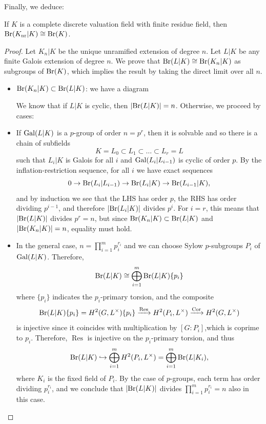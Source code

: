 \documentclass{article}
\begin{document}
Finally, we deduce:
\begin{prop}
		If $K$ is a complete discrete valuation field with finite residue field, then $\text{Br}(K_\text{nr}|K)\cong \text{Br}(K)$.
\end{prop}
\begin{proof}
		Let $K_n|K$ be the unique unramified extension of degree $n$. Let $L|K$ be any finite Galois extension of degree $n$. We prove that $\text{Br}(L|K)\cong\text{Br}(K_n|K)$ as subgroups of $\text{Br}(K)$, which implies the result by taking the direct limit over all $n$.

		\begin{itemize}
				\item $\text{Br}(K_n|K)\subset \text{Br}(L|K)$: we have a diagram

				We know that if $L|K$ is cyclic, then $|\text{Br}(L|K)|=n$. Otherwise, we proceed by cases:
				
				\item If $\operatorname{Gal}(L|K)$ is a $p$-group of order $n=p^r$, then it is solvable and so there is a chain of subfields
				\[
					K = L_0 \subset L_1 \subset \ldots \subset L_r = L	
				\]
				such that $L_i|K$ is Galois for all $i$ and $\operatorname{Gal}(L_i|L_{i-1})$ is cyclic of order $p$. By the inflation-restriction sequence, for all $i$ we have exact sequences
				\[
					0 \to \text{Br}(L_i|L_{i-1}) \to \text{Br}(L_i|K) \to \text{Br}(L_{i-1}|K),
				\]
				and by induction we see that the LHS has order $p$, the RHS has order dividing $p^{i-1}$, and therefore $|\text{Br}(L_i|K)|$ divides $p^i$. For $i=r$, this means that $|\text{Br}(L|K)|$ divides $p^r=n$, but since $\text{Br}(K_n|K)\subset \text{Br}(L|K)$ and $|\text{Br}(K_n|K)|=n$, equality must hold.

				\item In the general case, $n=\prod_{i=1}^m p_i^{r_i}$ and we can choose Sylow $p$-subgroups $P_i$ of $\operatorname{Gal}(L|K)$. Therefore, 
				\[
					\text{Br}(L|K)\cong \bigoplus_{i=1}^m \text{Br}(L|K)\{p_i\}
				\]
				where $\{p_i\}$ indicates the $p_i$-primary torsion, and the composite
				\[
					\text{Br}(L|K)\{p_i\}=H^2(G,L^\times)\{p_i\}\xrightarrow{\operatorname{Res}}H^2(P_i,L^\times)\xrightarrow{\operatorname{Cor}}H^2(G,L^\times)
				\]
				is injective since it coincides with multiplication by $[G:P_i]$,which is coprime to $p_i$. Therefore, $\operatorname{Res}$ is injective on the $p_i$-primary torsion, and thus
				\[
					\text{Br}(L|K)\hookrightarrow \bigoplus_{i=1}^m H^2(P_i,L^\times) = \bigoplus_{i=1}^m \text{Br}(L|K_i),
				\]
				where $K_i$ is the fixed field of $P_i$. By the case of $p$-groups, each term has order dividing $p_i^{r_i}$, and we conclude that $|\text{Br}(L|K)|$ divides $\prod_{i=1}^m p_i^{r_i}=n$ also in this case.
		\end{itemize}
\end{proof}
\end{document}
